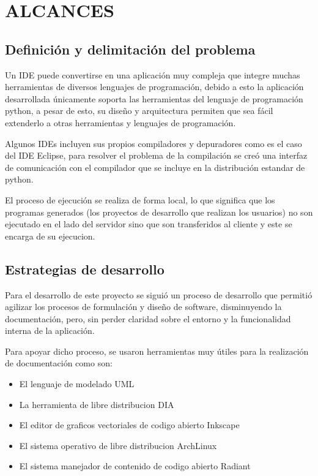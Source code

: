 \section{ALCANCES}

\subsection{Definición y delimitación del problema}

Un IDE puede convertirse en una aplicación muy compleja que integre muchas herramientas de diversos lenguajes de programación, debido a esto la aplicación desarrollada únicamente soporta las herramientas del lenguaje de programación python, a pesar de esto, su diseño y arquitectura permiten que sea fácil extenderlo a otras herramientas y lenguajes de programación.

Algunos IDEs incluyen sus propios compiladores y depuradores como es el caso del IDE Eclipse, para resolver el problema de la compilación se creó una interfaz de comunicación con el compilador que se incluye en la distribución estandar de python.

El proceso de ejecución se realiza de forma local, lo que significa que los programas generados (los proyectos de desarrollo que realizan los usuarios) no son ejecutado en el lado del servidor sino que son transferidos al cliente y este se encarga de su ejecucion.

\subsection{Estrategias de desarrollo}

Para el desarrollo de este proyecto se siguió un proceso de desarrollo que permitió agilizar los procesos de formulación y diseño de software, disminuyendo la documentación, pero, sin perder claridad sobre el entorno y la funcionalidad interna de la aplicación.

Para apoyar dicho proceso, se usaron herramientas muy útiles para la realización de documentación como son:

\begin{itemize}
	\item El lenguaje de modelado UML \cite{uml}
	\item La herramienta de libre distribucion DIA \cite{dia}
	\item El editor de graficos vectoriales de codigo abierto Inkscape \cite{inkscape}
	\item El sistema operativo de libre distribucion ArchLinux \cite{archlinux}
	\item El sistema manejador de contenido de codigo abierto Radiant \cite{radiant}
\end{itemize}
